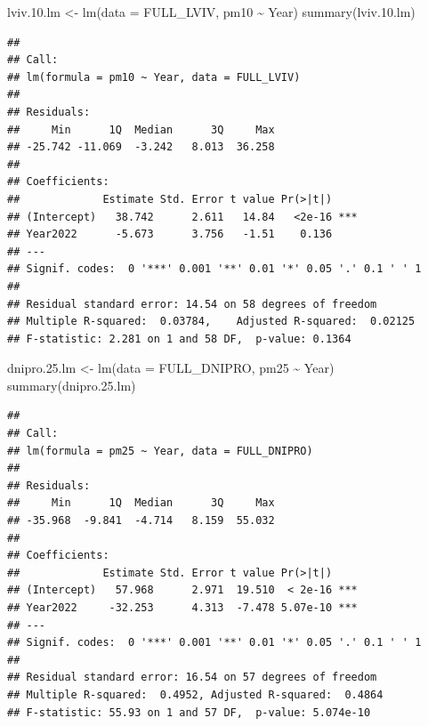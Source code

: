 \documentclass[
  12pt,
]{article}
\newenvironment{Shaded}{\begin{snugshade}}{\end{snugshade}}
\newcommand{\AttributeTok}[1]{\textcolor[rgb]{0.77,0.63,0.00}{#1}}
\newcommand{\FloatTok}[1]{\textcolor[rgb]{0.00,0.00,0.81}{#1}}
\newcommand{\FunctionTok}[1]{\textcolor[rgb]{0.00,0.00,0.00}{#1}}
\newcommand{\NormalTok}[1]{#1}
\newcommand{\OtherTok}[1]{\textcolor[rgb]{0.56,0.35,0.01}{#1}}
\newcommand{\SpecialCharTok}[1]{\textcolor[rgb]{0.00,0.00,0.00}{#1}}
\begin{document}
\begin{Shaded}
\begin{Highlighting}[]
\NormalTok{lviv.}\FloatTok{10.}\NormalTok{lm }\OtherTok{\textless{}{-}} \FunctionTok{lm}\NormalTok{(}\AttributeTok{data =}\NormalTok{ FULL\_LVIV, pm10 }\SpecialCharTok{\textasciitilde{}}\NormalTok{ Year) }
\FunctionTok{summary}\NormalTok{(lviv.}\FloatTok{10.}\NormalTok{lm) }
\end{Highlighting}
\end{Shaded}

\begin{verbatim}
## 
## Call:
## lm(formula = pm10 ~ Year, data = FULL_LVIV)
## 
## Residuals:
##     Min      1Q  Median      3Q     Max 
## -25.742 -11.069  -3.242   8.013  36.258 
## 
## Coefficients:
##             Estimate Std. Error t value Pr(>|t|)    
## (Intercept)   38.742      2.611   14.84   <2e-16 ***
## Year2022      -5.673      3.756   -1.51    0.136    
## ---
## Signif. codes:  0 '***' 0.001 '**' 0.01 '*' 0.05 '.' 0.1 ' ' 1
## 
## Residual standard error: 14.54 on 58 degrees of freedom
## Multiple R-squared:  0.03784,    Adjusted R-squared:  0.02125 
## F-statistic: 2.281 on 1 and 58 DF,  p-value: 0.1364
\end{verbatim}

\begin{Shaded}
\begin{Highlighting}[]
\NormalTok{dnipro.}\FloatTok{25.}\NormalTok{lm }\OtherTok{\textless{}{-}} \FunctionTok{lm}\NormalTok{(}\AttributeTok{data =}\NormalTok{ FULL\_DNIPRO, pm25 }\SpecialCharTok{\textasciitilde{}}\NormalTok{ Year) }
\FunctionTok{summary}\NormalTok{(dnipro.}\FloatTok{25.}\NormalTok{lm) }
\end{Highlighting}
\end{Shaded}

\begin{verbatim}
## 
## Call:
## lm(formula = pm25 ~ Year, data = FULL_DNIPRO)
## 
## Residuals:
##     Min      1Q  Median      3Q     Max 
## -35.968  -9.841  -4.714   8.159  55.032 
## 
## Coefficients:
##             Estimate Std. Error t value Pr(>|t|)    
## (Intercept)   57.968      2.971  19.510  < 2e-16 ***
## Year2022     -32.253      4.313  -7.478 5.07e-10 ***
## ---
## Signif. codes:  0 '***' 0.001 '**' 0.01 '*' 0.05 '.' 0.1 ' ' 1
## 
## Residual standard error: 16.54 on 57 degrees of freedom
## Multiple R-squared:  0.4952, Adjusted R-squared:  0.4864 
## F-statistic: 55.93 on 1 and 57 DF,  p-value: 5.074e-10
\end{verbatim}
\end{document}
